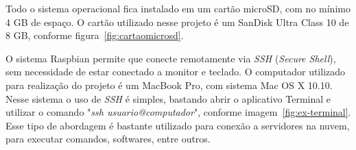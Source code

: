 \documentclass[
	12pt,				%
	openright,			%
	oneside,			%
	a4paper,			%
	chapter=TITLE,		%
	english,			%
	brazil				%
	]{abntex2}
\begin{document}
{\begin{figure}[h!]
\end{figure}

Todo o sistema operacional fica instalado em um cartão microSD, com no mínimo 4 GB de espaço. O cartão utilizado nesse projeto é um SanDisk Ultra Class 10 de 8 GB, conforme figura~\ref{fig:cartaomicrosd}.

\begin{figure}[h!]
\end{figure}

O sistema Raspbian permite que conecte remotamente via \textit{SSH} (\textit{Secure Shell}), sem necessidade de estar conectado a monitor e teclado. O computador utilizado para realização do projeto é um MacBook Pro, com sistema Mac OS X 10.10. Nesse sistema o uso de \textit{SSH} é simples, bastando abrir o aplicativo Terminal e utilizar o comando "\textit{ssh usuario@computador}", conforme imagem~\ref{fig:ex-terminal}. Esse tipo de abordagem é bastante utilizado para conexão a servidores na nuvem, para executar comandos, softwares, entre outros.

}
\end{document}
